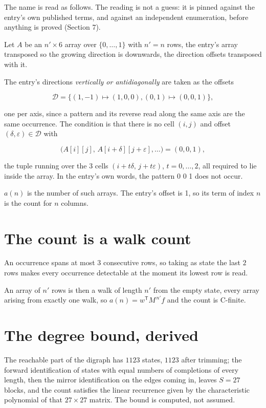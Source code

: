 \documentclass[11pt]{article}
\theoremstyle{definition}
\begin{document}
The name is read as follows. The reading is not a guess: it is pinned against the entry's own published terms, and against an independent enumeration, before anything is proved (Section 7).

Let $A$ be an $n' \times 6$ array over $\{0,\dots,1\}$ with $n' = n$ rows, the entry's array transposed so the growing direction is downwards, the direction offsets transposed with it.

The entry's directions {\itshape vertically or antidiagonally} are taken as the offsets

\[\mathcal{D} = \{(1,-1)\mapsto(1,0,0), (0,1)\mapsto(0,0,1)\},\]

one per axis, since a pattern and its reverse read along the same axis are the same occurrence. The condition is that there is no cell $(i,j)$ and offset $(\delta,\varepsilon)\in\mathcal{D}$ with

\[\bigl(A[i][j],\,A[i{+}\delta][j{+}\varepsilon],\dots\bigr) = (0, 0, 1),\]

the tuple running over the $3$ cells $(i+t\delta,\,j+t\varepsilon)$, $t = 0,\dots,2$, all required to lie inside the array. In the entry's own words, the pattern 0 0 1 does not occur.

$a(n)$ is the number of such arrays. The entry's offset is 1, so its term of index $n$ is the count for $n$ columns.

\section{The count is a walk count}

An occurrence spans at most $3$ consecutive rows, so taking as state the last $2$ rows makes every occurrence detectable at the moment its lowest row is read.

An array of $n'$ rows is then a walk of length $n'$ from the empty state, every array arising from exactly one walk, so $a(n) = w^{\mathsf T}M^{\,n'}f$ and the count is C-finite.

\section{The degree bound, derived}

The reachable part of the digraph has $1123$ states, $1123$ after trimming; the forward identification of states with equal numbers of completions of every length, then the mirror identification on the edges coming in, leaves $S = 27$ blocks, and the count satisfies the linear recurrence given by the characteristic polynomial of that $27\times27$ matrix. The bound is computed, not assumed.
\end{document}
